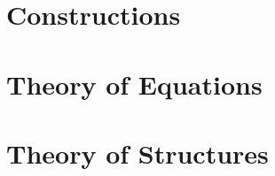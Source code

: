 \documentclass{book}
\newcounter{t}
\theoremstyle{definition}
\begin{document}
\frontmatter



\tableofcontents

\setcounter{chapter}{-1}

\mainmatter



\part{Constructions}






\part{Theory of Equations}




\part{Theory of Structures}


\backmatter
\end{document}
